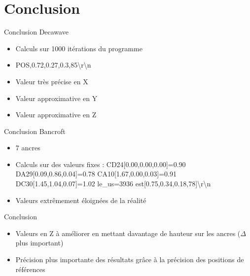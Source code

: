 \documentclass[12pt]{beamer}
\begin{document}
	\section{Conclusion}
    \begin{frame}[allowframebreaks]
        \begin{alertblock}{Conclusion Decawave}
            \begin{itemize}
                [triangle]
                \item Calculs sur 1000 itérations du programme
                \item POS,0.72,0.27,0.3,85\textbackslash r\textbackslash n
                \item Valeur très précise en X
                \item Valeur approximative en Y
                \item Valeur approximative en Z
            \end{itemize}
        \end{alertblock}
        
        \begin{alertblock}{Conclusion Bancroft}
            \begin{itemize}
                [triangle]
                \item 7 ancres
                \item Calculs sur des valeurs fixes : CD24[0.00,0.00,0.00]=0.90 DA29[0.09,0.86,0.04]=0.78 CA10[1.67,0.00,0.03]=0.91 DC30[1.45,1.04,0.07]=1.02 le\_us=3936 est[0.75,0.34,0.18,78]\textbackslash r\textbackslash n
                \item Valeurs extrêmement éloignées de la réalité 
            \end{itemize}
        \end{alertblock}
        
        \begin{alertblock}{Conclusion}
            \begin{itemize}
                [triangle]
                \item Valeurs en Z à améliorer en mettant davantage de hauteur sur les ancres ($\Delta$ plus important)
                \item Précision plus importante des résultats grâce à la précision des positions de références
            \end{itemize}
        \end{alertblock}
    \end{frame}
\end{document}
